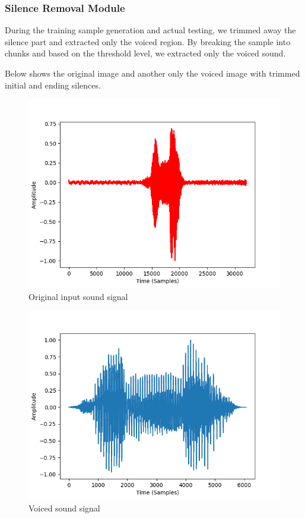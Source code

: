 \subsubsection{Silence Removal Module}
	
	During the training sample generation and actual testing, we trimmed away the silence part and extracted only the voiced region. By breaking the sample into chunks and based on the threshold level, we extracted only the voiced sound. 
	
	Below shows the original image and another only the voiced image with trimmed initial and ending silences.
	
	\begin{figure}[H]
		\begin{center}
			\includegraphics[scale=0.8]{images/mainSigOriginal.png}
			\caption{Original input sound signal}
			\label{orginal}
		\end{center}
	\end{figure}
	
	
	\begin{figure}[H]
		\begin{center}
			\includegraphics[scale=0.8]{images/voiced_sound.png}
			\caption{Voiced sound signal}
			\label{Voiced}
		\end{center}
	\end{figure}
	

